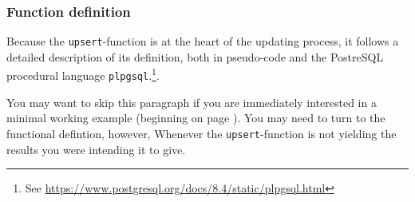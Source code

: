 \subsubsection{Function definition}

Because the \texttt{upsert}-function is at the heart of the updating process, it follows a detailed description of its definition, both in pseudo-code and the PostreSQL procedural language \texttt{plpgsql}.\footnote{See \url{https://www.postgresql.org/docs/8.4/static/plpgsql.html}}.

You may want to skip this paragraph if you are immediately interested in a minimal working example (beginning on page \pageref{par_upsert_minimal_working_example}). 
You may need to turn to the functional defintion, however, Whenever the \texttt{upsert}-function is not yielding the results you were intending it to give.


